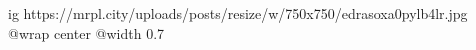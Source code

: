  
 
 
 
 

\ifcmt
  ig https://mrpl.city/uploads/posts/resize/w/750x750/edrasoxa0pylb4lr.jpg
  @wrap center
  @width 0.7
\fi
